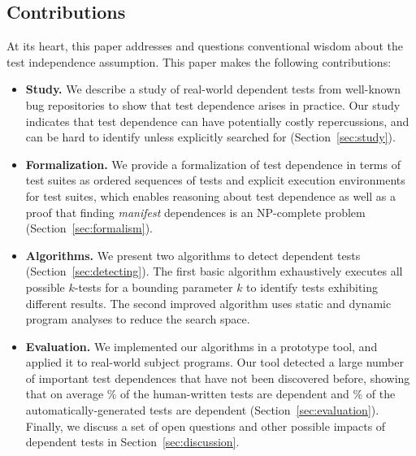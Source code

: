 
\subsection{Contributions}

At its heart, this paper addresses and questions
conventional wisdom about the test independence assumption. 
This paper makes the following contributions:

\begin{itemize}

  \item \textbf{Study.} We describe a study of  real-world
  dependent tests from well-known bug repositories to show that test dependence
  arises in practice. Our study indicates that test dependence can have
  potentially costly repercussions, and can be hard to identify unless
  explicitly searched for (Section~\ref{sec:study}).

\item \textbf{Formalization.} We provide a formalization of test dependence
  in terms of test suites as ordered sequences of tests and explicit execution
  environments for test suites, which enables reasoning about test dependence
  as well as a proof that finding \emph{manifest} dependences is an NP-complete
  problem (Section~\ref{sec:formalism}).

  \item \textbf{Algorithms.} We present two algorithms
  to detect dependent tests (Section~\ref{sec:detecting}). The first
  basic algorithm exhaustively executes all possible $k$-tests for
  a bounding parameter $k$ to identify tests exhibiting different results.
  The second improved algorithm uses static and dynamic program analyses
  to reduce the search space. 

  \item \textbf{Evaluation.} We implemented our algorithms in a prototype
  tool, and applied it to  real-world subject programs. Our
  tool detected a large number of important test dependences that have not
  been discovered before, showing that on average \% of the human-written
  tests are dependent and \% of the automatically-generated tests are dependent
   (Section~\ref{sec:evaluation}).
  Finally, we discuss a set of open questions and other possible impacts of dependent
  tests in Section~\ref{sec:discussion}.
\end{itemize}



